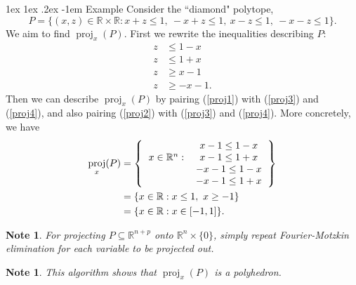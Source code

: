 \documentclass[11pt]{article}
\makeatletter
\renewcommand\paragraph{\@startsection{paragraph}{4}{0mm}%
                                    {1ex \@plus1ex \@minus.2ex}%
                                    {-1em}%
                                    {\normalfont\normalsize\bfseries}}
\newtheorem{note}[fact]{Note}
\newcommand{\R}{\ensuremath{\mathbb R}}
\DeclareMathOperator{\proj}{proj}
\makeatother
\begin{document}
\paragraph{Example}
Consider the ``diamond" polytope, $$P = \{(x,z) \in \R \times \R:  x+z \leq 1,\ -x+z \leq 1,\ x-z \leq 1,\ -x-z \leq 1\}.$$
We aim to find $\proj_x(P)$. First we rewrite the inequalities describing $P$:
\begin{align}
z &\leq 1 - x \label{proj1} \\
z &\leq 1 + x \label{proj2} \\
z &\geq x - 1 \label{proj3} \\
z &\geq -x-1  \label{proj4}.
\end{align}
Then we can describe $\proj_x(P)$ by pairing (\ref{proj1}) with (\ref{proj3}) and (\ref{proj4}), and also pairing (\ref{proj2}) with (\ref{proj3}) and (\ref{proj4}). More concretely, we have
\begin{align*}
\proj_x(P) &=  \left \{ \begin{tabular}{ccc} &$x-1 \leq 1-x$ \\
$x \in \R^n : $&$x-1 \leq 1+x$ \\
&$-x-1 \leq 1-x$ \\
&$-x-1 \leq 1+x$
 \end{tabular} \right \}\\
&= \{x \in \R : x \leq 1,\ x \geq - 1\}\\
&= \{x \in \R :  x \in [-1,1]\}.
\end{align*}
\begin{note}
For projecting $P \subseteq \R^{n+p}$ onto $\R^n \times \{0\}$, simply repeat Fourier-Motzkin elimination for each variable to be projected out.
\end{note}
\begin{note}
This algorithm shows that $\proj_x(P)$ is a polyhedron.
\end{note}
\end{document}
